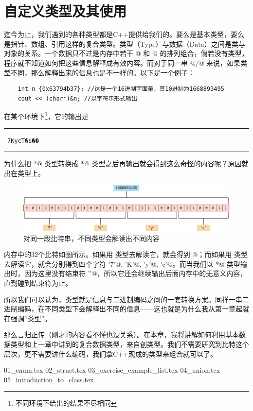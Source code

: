 \chapter{自定义类型及其使用}
迄今为止，我们遇到的各种类型都是C++提供给我们的。要么是基本类型，要么是指针、数组、引用这样的复合类型。类型（Type）与数据（Data）之间是类与对象的关系。一个数据只不过是内存中若干 @ 和 @ 的排列组合，倘若没有类型，程序就不知道如何把这些信息解释成有效内容。而对于同一串 @/@ 来说，如果类型不同，那么解释出来的信息也是不一样的。以下是一个例子：
\begin{lstlisting}
    int n {0x63794b37}; //这是一个16进制字面量，其10进制为1668893495
    cout << (char*)&n; //以字符串形式输出
\end{lstlisting}
在某个环境下\footnote{不同环境下给出的结果不尽相同}，它的输出是\\\noindent\rule{\linewidth}{.2pt}\texttt{
7KycT�\$��
}\\\noindent\rule{\linewidth}{.2pt}
为什么把 \lstinline@int*@ 类型转换成 \lstinline@char*@ 类型之后再输出就会得到这么奇怪的内容呢？原因就出在类型上。\par
\begin{figure}[htbp]
    \centering
    \includegraphics[width=\textwidth]{../images/generalized_parts/06_0_1_string_to_int_or_char_300.png}
    \caption{对同一段比特串，不同类型会解读出不同内容}
\end{figure}
内存中的32个比特如图所示。如果用 \lstinline@int@ 类型去解读它，就会得到 @；而如果用 \lstinline@char@ 类型去解读它，就会分别得到四个字符 \lstinline@'7'@, \lstinline@'K'@, \lstinline@'y'@, \lstinline@'c'@。而当我们以 \lstinline@char*@ 类型输出时，因为这里没有结束符 \lstinline@'\0'@，所以它还会继续输出后面内存中的无意义内容，直到碰到结束符为止。\par
所以我们可以认为，类型就是信息与二进制编码之间的一套转换方案。同样一串二进制编码，在不同类型下会解释出不同的信息——这也就是为什么我从第一章起就在强调``类型''。\par
那么言归正传（刚才的内容看不懂也没关系）。在本章，我将讲解如何利用基本数据类型和上一章中讲到的复合数据类型，来自创类型。我们不需要研究到比特这个层次，更不需要讲什么编码，我们拿C++现成的类型来组合就可以了。\par
{01_enum.tex}
{02_struct.tex}
{03_exercise_example_list.tex}
{04_union.tex}
{05_introduction_to_class.tex}
